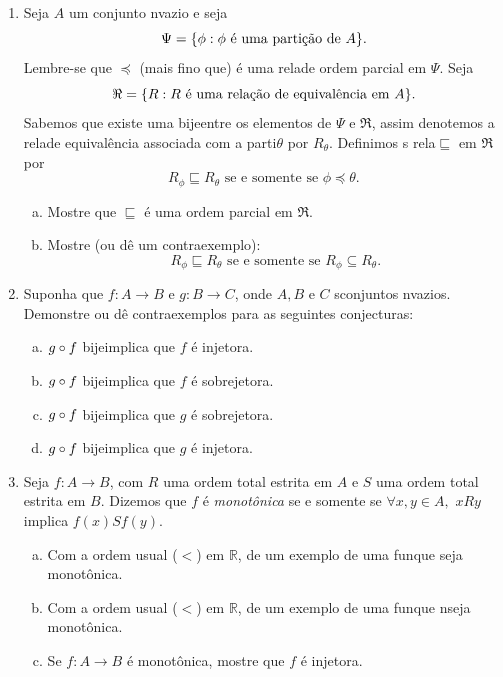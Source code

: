 \begin{enumerate}[{\bf 1.}]
\item Seja $A$ um conjunto n\ao vazio e seja 
\[
\Psi=\{\phi: \phi \textrm{ \'e uma parti\cao de } A\}.
\] 
Lembre-se que $\preceq$ (mais fino que) \'e uma rela\cao de ordem parcial em $\Psi$. Seja
\[
\Re=\{R: R \textrm{ \'e uma rela\cao de equival\^encia em } A\}.
\]
Sabemos que existe uma bije\cao entre os elementos de $\Psi$ e $\Re$, assim denotemos a rela\cao de equival\^encia associada com a parti\cao $\theta$ por $R_{\theta}$. Definimos s rela\cao $\sqsubseteq$ em $\Re$ por
\[
R_{\phi}\sqsubseteq R_{\theta} \textrm{ se e somente se } \phi \preceq \theta.
\]
\begin{enumerate}[a)]
\item Mostre que $\sqsubseteq$ \'e uma ordem parcial em $\Re$.
\item Mostre (ou d\^e um contraexemplo):
\[
R_{\phi}\sqsubseteq R_{\theta} \textrm{ se e somente se } R_{\phi}\subseteq R_{\theta}.
\]
\end{enumerate}

\item Suponha que $f:A\to B$ e $g:B\to C$, onde $A,B$ e $C$ s\ao conjuntos n\ao vazios. Demonstre ou d\^e contraexemplos para as seguintes conjecturas:
\begin{enumerate}[a)]
\item $g\circ f$ bije\cao implica que $f$ \'e injetora. 
\item $g\circ f$ bije\cao implica que $f$ \'e sobrejetora.
\item $g\circ f$ bije\cao implica que $g$ \'e sobrejetora.
\item $g\circ f$ bije\cao implica que $g$ \'e injetora.
\end{enumerate}

\item Seja $f:A\to B$, com $R$ uma ordem total estrita em $A$ e $S$ uma ordem total estrita em $B$. Dizemos que $f$ \'e {\it monot\^onica} se e somente se $\forall x,y\in A,$ $xRy$ implica $f(x)Sf(y)$.
\begin{enumerate}[a)]
\item Com a ordem usual ($<$) em $\mathbb{R}$, de um exemplo de uma fun\cao que seja monot\^onica.
\item Com a ordem usual ($<$) em $\mathbb{R}$, de um exemplo de uma fun\cao que n\ao seja monot\^onica.
\item Se $f:A\to B$ \'e monot\^onica, mostre que $f$ \'e injetora.
\end{enumerate}


\end{enumerate}
